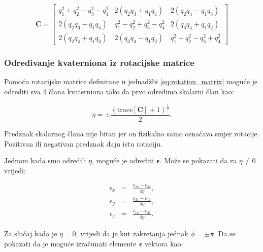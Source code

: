 \documentclass[times, utf8, diplomski, numeric]{templates/template}
\begin{document}
{{{            \begin{equation}
                \boldsymbol{C} =
                \begin{bmatrix}
                    q_1^2 + q_2^2 - q_3^2 - q_4^2 & 2(q_2q_3 + q_1q_4) & 2(q_2q_4 - q_1q_3) \\
                    2(q_2q_3 - q_1q_4) & q_1^2 - q_2^2 + q_3^2 - q_4^2 & 2(q_3q_4 + q_1q_2) \\
                    2(q_2q_4 + q_1q_3) & 2(q_3q_4 - q_1q_2) & q_1^2 - q_2^2 - q_3^2 + q_4^2 
                \end{bmatrix}
            \label{eq:rot_mat_quat}
            \end{equation}

            \subsubsection{Određivanje kvaterniona iz rotacijske matrice}{
                Pomoću rotacijske matrice definirane u jednadžbi \ref{eq:rotation_matrix} moguće je odrediti sva 4 člana kvaterniona tako da prvo odredimo skalarni član kao:

                \begin{equation}
                    \eta = \pm\frac{(\text{trace}[\boldsymbol{C}] + 1)^{\frac{1}{2}}}{2}.
                \end{equation}

                Predznak skalarnog člana nije bitan jer on fizikalno samo označava smjer rotacije. Pozitivan ili negativan predznak daju istu rotaciju.

                Jednom kada smo odredili $\eta$, moguće je odrediti $\boldsymbol\epsilon$. Može se pokazati da za $\eta \neq 0$ vrijedi:

                \begin{equation}
                \begin{array}{rcl}
                    \epsilon_{x} & = & \frac{c_{23} - c_{32}}{4\eta}, \\
                    \epsilon_{y} & = & \frac{c_{31} - c_{13}}{4\eta}, \\
                    \epsilon_{z} & = & \frac{c_{12} - c_{21}}{4\eta}.
                \end{array}
                \end{equation}

                Za slučaj kada je $\eta=0$, vrijedi da je kut zakretanja jednak $\phi=\pm\pi$. Da se pokazati da je moguće izračunati elemente $\boldsymbol\epsilon$ vektora kao:

}}}}
\end{document}
